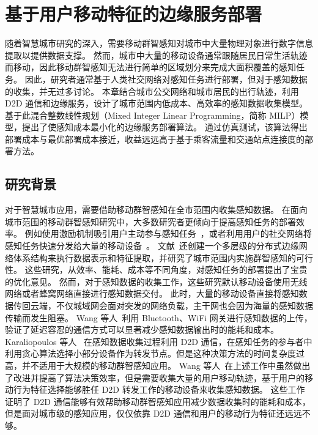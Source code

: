 \chapter{基于用户移动特征的边缘服务部署}

随着智慧城市研究的深入，需要移动群智感知对城市中大量物理对象进行数字信息提取以提供数据支撑。
然而，城市中大量的移动设备通常跟随居民日常生活轨迹而移动，因此移动群智感知无法进行简单的区域划分来完成大面积覆盖的感知任务。
因此，研究者通常基于人类社交网络对感知任务进行部署，但对于感知数据的收集，并无过多讨论。
本章结合城市公交网络和城市居民的出行轨迹，利用 D2D 通信和边缘服务，设计了城市范围内低成本、高效率的感知数据收集模型。
基于此混合整数线性规划（Mixed Integer Linear Programming，简称 MILP）模型，提出了使感知成本最小化的边缘服务部署算法。
通过仿真测试，该算法得出部署成本与最优部署成本接近，收益远远高于基于乘客流量和交通站点连接度的部署方法。

\section{研究背景}

对于智慧城市应用，需要借助移动群智感知在全市范围内收集感知数据。
在面向城市范围的移动群智感知研究中，大多数研究者更倾向于提高感知任务的部署效率。
例如使用激励机制吸引用户主动参与感知任务~\cite{CNKI:JiaChaopeng, CNKI:WuMCSIncentive, jiyubianyuanjisuangongyecaiji}，或者利用用户的社交网络将感知任务快速分发给大量的移动设备~\cite{Cnki:Yu2018}。
文献~\cite{DBLP:journals/tii/TangCHPWHY17}还创建一个多层级的分布式边缘网络体系结构来执行数据表示和特征提取，并研究了城市范围内实施群智感知的可行性。
这些研究，从效率、能耗、成本等不同角度，对感知任务的部署提出了宝贵的优化意见。
然而，对于感知数据的收集工作，这些研究默认移动设备使用无线网络或者蜂窝网络直接进行感知数据交付。
此时，大量的移动设备直接将感知数据传回云端，不仅城域网会面对突发的网络负载，主干网也会因为海量的感知数据传输而发生阻塞。
Wang 等人~\cite{DBLP:conf/huc/WangZX13}利用 Bluetooth、WiFi 网关进行感知数据的上传，验证了延迟容忍的通信方式可以显著减少感知数据输出时的能耗和成本。
Karaliopoulos 等人~\cite{DBLP:conf/infocom/KaraliopoulosTK15} 在感知数据收集过程利用 D2D 通信，在感知任务的参与者中利用贪心算法选择小部分设备作为转发节点。但是这种决策方法的时间复杂度过高，并不适用于大规模的移动群智感知应用。
Wang 等人~\cite{DBLP:journals/puc/WangLL17}在上述工作中虽然做出了改进并提高了算法决策效率，但是需要收集大量的用户移动轨迹，基于用户的移动行为特征选择能够胜任 D2D 转发工作的移动设备来收集感知数据。
这些工作证明了 D2D 通信能够有效帮助移动群智感知应用减少数据收集时的能耗和成本，但是面对城市级的感知应用，仅仅依靠 D2D 通信和用户的移动行为特征还远远不够。

